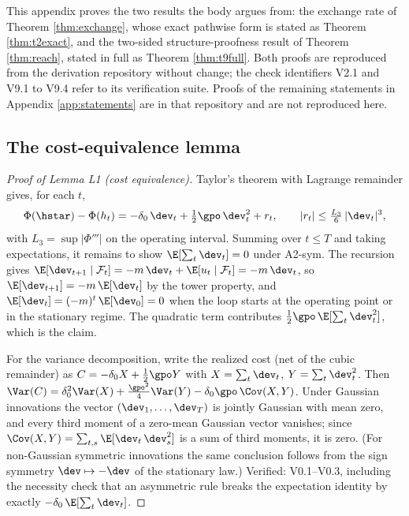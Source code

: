 
This appendix proves the two results the body argues from: the exchange
rate of Theorem \ref{thm:exchange}, whose exact pathwise form is stated as
Theorem \ref{thm:t2exact}, and the two-sided structure-proofness result of
Theorem \ref{thm:reach}, stated in full as Theorem \ref{thm:t9full}. Both
proofs are
reproduced from the derivation repository without change; the check
identifiers V2.1 and V9.1 to V9.4 refer to its verification suite. Proofs of
the remaining statements in Appendix \ref{app:statements} are in that
repository and are not reproduced here.

\subsection*{The cost-equivalence lemma}

\begin{proof}[Proof of Lemma L1 (cost equivalence)]
Taylor's theorem with Lagrange remainder gives, for each $t$,
\[
\Phi(\hstar) - \Phi(h_t)
 = -\delta_0\,\dev_t + \tfrac{1}{2}\gpo\,\dev_t^2 + r_t,
 \qquad |r_t| \le \tfrac{L_3}{6}\,|\dev_t|^3,
\]
with $L_3 = \sup |\Phi'''|$ on the operating interval. Summing over
$t \le T$ and taking expectations, it remains to show
$\E[\sum_t \dev_t] = 0$ under A2-sym. The recursion gives
$\E[\dev_{t+1} \mid \mathcal{F}_t] = -m\,\dev_t + \E[u_t \mid \mathcal{F}_t]
= -m\,\dev_t$, so $\E[\dev_{t+1}] = -m\,\E[\dev_t]$ by the tower property,
and $\E[\dev_t] = (-m)^t\,\E[\dev_0] = 0$ when the loop starts at the
operating point or in the stationary regime. The quadratic term contributes
$\tfrac{1}{2}\gpo\,\E[\sum_t \dev_t^2]$, which is the claim.

For the variance decomposition, write the realized cost (net of the cubic
remainder) as $C = -\delta_0 X + \tfrac{1}{2}\gpo Y$ with
$X = \sum_t \dev_t$, $Y = \sum_t \dev_t^2$. Then
$\Var(C) = \delta_0^2 \Var(X) + \tfrac{\gpo^2}{4}\Var(Y)
- \delta_0\gpo\,\Cov(X, Y)$. Under Gaussian innovations the vector
$(\dev_1,\dots,\dev_T)$ is jointly Gaussian with mean zero, and every third
moment of a zero-mean Gaussian vector vanishes; since
$\Cov(X,Y) = \sum_{t,s}\E[\dev_t\,\dev_s^2]$ is a sum of third moments, it is
zero. (For non-Gaussian symmetric innovations the same conclusion follows
from the sign symmetry $\dev \mapsto -\dev$ of the stationary law.)
Verified: V0.1--V0.3, including the necessity check that an asymmetric rule
breaks the expectation identity by exactly $-\delta_0\,\E[\sum_t \dev_t]$.
\end{proof}

